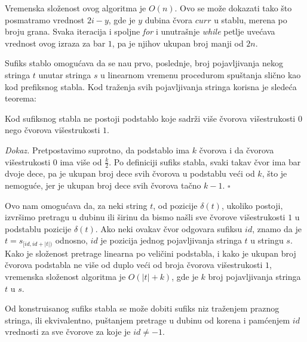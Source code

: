 \noindent
\begin{minipage}[l]{\textwidth}

\end{minipage}

Vremenska slo\v zenost ovog algoritma je $O(n)$. Ovo se mo\v ze dokazati tako \v sto posmatramo vrednost $2i-y$, gde je $y$ dubina \v cvora $curr$ u stablu, merena po broju grana. Svaka iteracija i spoljne \textit{for} i unutra\v snje \textit{while} petlje uve\' cava vrednost ovog izraza za bar $1$, pa je njihov ukupan broj manji od $2n$.

Sufiks stablo omogu\' cava da se na\dj u prvo, poslednje, broj pojavljivanja nekog stringa $t$ unutar stringa $s$ u linearnom vremenu procedurom spu\v stanja sli\v cno kao kod prefiksnog stabla. Kod tra\v zenja svih pojavljivanja stringa korisna je slede\' ca teorema:

\begin{thm}
Kod sufiksnog stabla ne postoji podstablo koje sadr\v zi vi\v se \v cvorova vi\v sestrukosti $0$ nego \v cvorova vi\v sestrukosti $1$.
\end{thm}

\textit{Dokaz.} Pretpostavimo suprotno, da podstablo ima $k$ \v cvorova i da \v cvorova vi\v sestrukosti $0$ ima vi\v se od $\frac{k}{2}$. Po definiciji sufiks stabla, svaki takav \v cvor ima bar dvoje dece, pa je ukupan broj dece svih \v cvorova u podstablu ve\' ci od $k$, \v sto je nemogu\' ce, jer je ukupan broj dece svih \v cvorova ta\v cno $k-1$. \hfill $\square$

Ovo nam omogu\' cava da, za neki string $t$, od pozicije $\delta(t)$, ukoliko postoji, izvr\v simo pretragu u dubinu ili \v sirinu da bismo na\v sli sve \v cvorove vi\v sestrukosti $1$ u podstablu pozicije $\delta(t)$. Ako neki ovakav \v cvor odgovara sufiksu $id$, znamo da je $t = s_{[id, id+|t|)}$ odnosno, $id$ je pozicija jednog pojavljivanja stringa $t$ u stringu $s$. Kako je slo\v zenost pretrage linearna po veli\v cini podstabla, i kako je ukupan broj \v cvorova podstabla ne vi\v se od duplo ve\' ci od broja \v cvorova vi\v sestrukosti $1$, vremenska slo\v zenost algoritma je $O(|t|+k)$, gde je $k$ broj pojavljivanja stringa $t$ u $s$.

Od konstruisanog sufiks stabla se mo\v ze dobiti sufiks niz tra\v zenjem praznog stringa, ili ekvivalentno, pu\v stanjem pretrage u dubinu od korena i pam\' cenjem $id$ vrednosti za sve \v cvorove za koje je $id \not = -1$.

